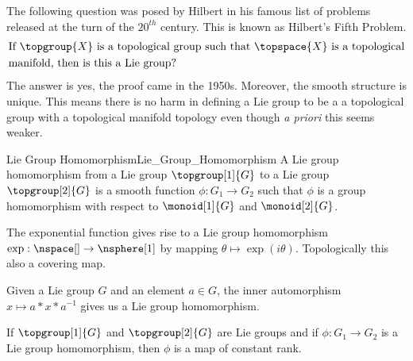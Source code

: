\documentclass{book}                                                            %
\begin{document}
            The following question was posed by Hilbert in his famous list of
            problems released at the turn of the $20^{th}$ century. This is
            known as Hilbert's Fifth Problem.
            \begin{equation}
                \begin{split}
                    &\text{If }\topgroup{X}
                    \text{ is a topological group such that }
                    \topspace{X}\text{ is a topological}\\
                    &\text{manifold, then is this a Lie group?}
                \end{split}
            \end{equation}
            The answer is yes, the proof came in the 1950s. Moreover, the
            smooth structure is unique. This means there is no harm in defining
            a Lie group to be a a topological group with a topological manifold
            topology even though \textit{a priori} this seems weaker.
            \begin{fdefinition}{Lie Group Homomorphism}{Lie_Group_Homomorphism}
                A Lie group homomorphism from a Lie group
                $\topgroup[1]{G}$ to a Lie group $\topgroup[2]{G}$ is a smooth
                function $\phi:G_{1}\rightarrow{G}_{2}$ such that $\phi$ is a
                group homomorphism with respect to $\monoid[1]{G}$ and
                $\monoid[2]{G}$.
            \end{fdefinition}
            \begin{example}
                The exponential function gives rise to a Lie group homomorphism
                $\exp:\nspace[]\rightarrow\nsphere[1]$ by mapping
                $\theta\mapsto\exp(i\theta)$. Topologically this also a covering
                map.
            \end{example}
            \begin{example}
                Given a Lie group $G$ and an element $a\in{G}$, the inner
                automorphism $x\mapsto{a}*x*a^{\minus{1}}$ gives us a Lie group
                homomorphism.
            \end{example}
            \begin{theorem}
                If $\topgroup[1]{G}$ and $\topgroup[2]{G}$ are Lie groups and if
                $\phi:G_{1}\rightarrow{G}_{2}$ is a Lie group homomorphism, then
                $\phi$ is a map of constant rank.
            \end{theorem}
\end{document}
